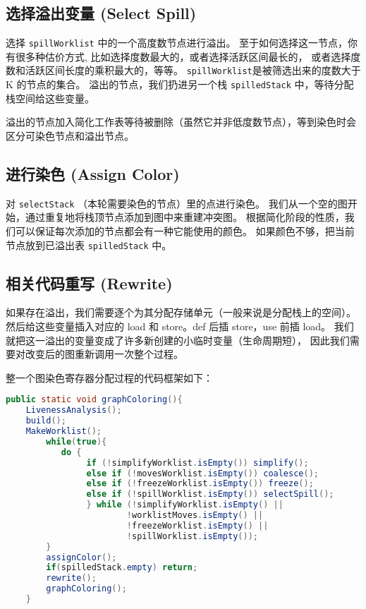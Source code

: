 \subsection{选择溢出变量 (Select Spill)}

选择 \texttt{spillWorklist} 中的一个高度数节点进行溢出。
至于如何选择这一节点，你有很多种估价方式, 比如选择度数最大的，或者选择活跃区间最长的，
或者选择度数和活跃区间长度的乘积最大的，等等。
\texttt{spillWorklist}是被筛选出来的度数大于 K 的节点的集合。
溢出的节点，我们扔进另一个栈 \texttt{spilledStack} 中，等待分配栈空间给这些变量。

溢出的节点加入简化工作表等待被删除（虽然它并非低度数节点），等到染色时会区分可染色节点和溢出节点。

\subsection{进行染色 (Assign Color)}

对 \texttt{selectStack} （本轮需要染色的节点）里的点进行染色。
我们从一个空的图开始，通过重复地将栈顶节点添加到图中来重建冲突图。
根据简化阶段的性质，我们可以保证每次添加的节点都会有一种它能使用的颜色。
如果颜色不够，把当前节点放到已溢出表 \texttt{spilledStack} 中。

\subsection{相关代码重写 (Rewrite)}

如果存在溢出，我们需要逐个为其分配存储单元（一般来说是分配栈上的空间）。
然后给这些变量插入对应的 load 和 store。def 后插 store，use 前插 load。
我们就把这一溢出的变量变成了许多新创建的小临时变量（生命周期短），
因此我们需要对改变后的图重新调用一次整个过程。

整一个图染色寄存器分配过程的代码框架如下：
\begin{lstlisting}[language=java]
    public static void graphColoring(){
    LivenessAnalysis();    
    build();
    MakeWorklist();
        while(true){
           do {
                if (!simplifyWorklist.isEmpty()) simplify();
                else if (!movesWorklist.isEmpty()) coalesce();
                else if (!freezeWorklist.isEmpty()) freeze();
                else if (!spillWorklist.isEmpty()) selectSpill();
                } while (!simplifyWorklist.isEmpty() ||
                        !worklistMoves.isEmpty() ||
                        !freezeWorklist.isEmpty() ||
                        !spillWorklist.isEmpty());
        }
        assignColor();
        if(spilledStack.empty) return;
        rewrite();
        graphColoring();
    }
\end{lstlisting}

